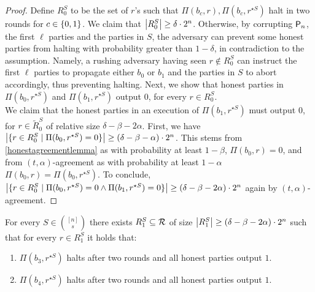 \begin{proof}
	Define $R_0^S$ to be the set of $r$'s such that $\Pi(b_c,r), \Pi(b_c,r^{\star S})$ halt in two rounds for $c \in \{0,1\}$. We claim that $\left\lvert R_0^S \right\rvert \geq \delta\cdot 2^n$. Otherwise, by corrupting $\mathsf{P}_n$, the first $\ell$ parties and the parties in $S$, the adversary can prevent some honest parties from halting with probability greater than $1-\delta$, in contradiction to the assumption. Namely, a rushing adversary having seen $r \notin R_0^S$ can instruct the first $\ell$ parties to propagate either $b_0$ or $b_1$ and the parties in $S$ to abort accordingly, thus preventing halting. Next, we show that honest parties in  $\Pi(b_0,r^{\star S})$ and  $\Pi(b_1,r^{\star S})$ output $0$, for every $r \in R_0^S$.
	\\ 
	 We claim that the honest parties in an execution of $\Pi(b_1,r^{\star S})$ must output $0$, for $r \in \tilde{R}_0^S$ of relative size $\delta - \beta - 2\alpha$. First, we have $\left|\{r \in R_0^S \mid \Pi(b_0,r^{\star S}) = 0\}\right| \geq (\delta-\beta-\alpha)\cdot 2^n$. This stems from \cref{honestagreementlemma} as with probability at least $1-\beta$, $\Pi(b_0,r) = 0$, and from $(t,\alpha)$-agreement as with probability at least $1-\alpha$ $\Pi(b_0,r) = \Pi(b_0,r^{\star S})$.
	 To conclude, $\left|\{r \in R_0^S \mid \Pi(b_0,r^{\star S}) = 0 \land \Pi(b_1,r^{\star S}) = 0\}\right| \geq (\delta - \beta - 2\alpha)\cdot 2^n$ again by $(t,\alpha)$-agreement.
\end{proof}

\begin{claim}\label{clm6.3}
For every $S \in \binom{[n]}{s}$ there exists $R^S_1 \subseteq \mathcal{R}$ of size $\left\lvert R^S_1 \right\rvert \geq (\delta-\beta -2\alpha) \cdot 2^{n}$ such that for every $r \in R^S_1$ it holds that:
\begin{enumerate}
	\item $\Pi(b_3,r^{\star S})$ halts after two rounds and all honest parties output $1$.
	\item $\Pi(b_4,r^{\star S})$ halts after two rounds and all honest parties output $1$.
\end{enumerate}
\end{claim}

